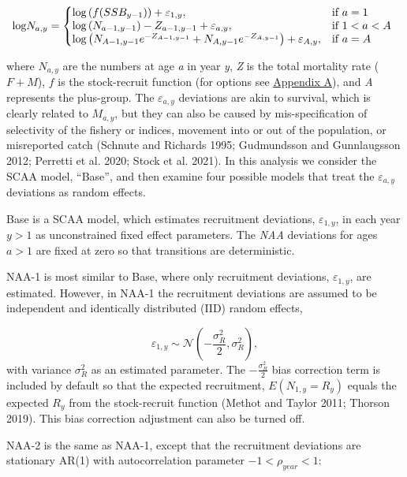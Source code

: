 \documentclass[]{article}
\begin{document}
\begin{equation}
\label{eq:NAA}
  \text{log}N_{a,y}=\left\{
    \begin{array}{@{}lll@{}}
      \text{log} \left( f(SSB_{y-1}) \right) + \varepsilon_{1,y}, & \text{if}\ a = 1 \\
      \text{log} \left( N_{a-1,y-1} \right) - Z_{a-1,y-1} + \varepsilon_{a,y}, & \text{if}\ 1 < a < A \\
      \text{log} \left( N_{A-1,y-1} e^{-Z_{A-1,y-1}} + N_{A,y-1} e^{-Z_{A,y-1}} \right) + \varepsilon_{A,y}, & \text{if}\ a = A
    \end{array}\right.
\end{equation}

where \(N_{a,y}\) are the numbers at age \emph{a} in year \emph{y},
\emph{Z} is the total mortality rate (\(F + M\)), \(f\) is the
stock-recruit function (for options see
\protect\hyperlink{appendix-a}{Appendix A}), and \emph{A} represents the
plus-group. The \(\varepsilon_{a,y}\) deviations are akin to survival,
which is clearly related to \(M_{a,y}\), but they can also be caused by
mis-specification of selectivity of the fishery or indices, movement
into or out of the population, or misreported catch (Schnute and
Richards 1995; Gudmundsson and Gunnlaugsson 2012; Perretti et al. 2020;
Stock et al. 2021). In this analysis we consider the SCAA model,
``Base'', and then examine four possible models that treat the
\(\varepsilon_{a,y}\) deviations as random effects.

Base is a SCAA model, which estimates recruitment deviations,
\(\varepsilon_{1,y}\), in each year \(y > 1\) as unconstrained fixed
effect parameters. The \emph{NAA} deviations for ages \(a > 1\) are
fixed at zero so that transitions are deterministic.

NAA-1 is most similar to Base, where only recruitment deviations,
\(\varepsilon_{1,y}\), are estimated. However, in NAA-1 the recruitment
deviations are assumed to be independent and identically distributed
(IID) random effects,

\[\varepsilon_{1,y} \sim \mathcal{N}\left( - \frac{\sigma^2_R}{2}, \sigma^2_R \right),\]
with variance \(\sigma^2_R\) as an estimated parameter. The
\(- \frac{\sigma^2_R}{2}\) bias correction term is included by default
so that the expected recruitment, \(E(N_{1,y} = R_y)\) equals the
expected \(R_y\) from the stock-recruit function (Methot and Taylor
2011; Thorson 2019). This bias correction adjustment can also be turned
off.

NAA-2 is the same as NAA-1, except that the recruitment deviations are
stationary AR(1) with autocorrelation parameter \(-1<\rho_{year}<1\):
\end{document}
